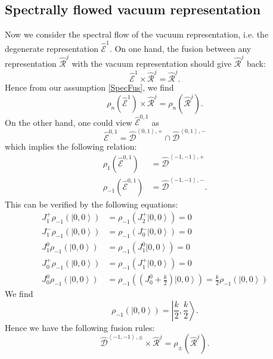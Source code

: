 \documentclass[10pt,a4paper]{article}
\numberwithin{equation}{section}
\newcommand{\ket}[1]{\left| #1 \right\rangle}
\newcommand{\vev}[1]{\left\langle #1 \right\rangle}
\begin{document}
\subsection{Spectrally flowed vacuum representation}
Now we consider the spectral flow of the vacuum representation, i.e. the degenerate representation $\hat{\mathcal{E}}^{1}$.
On one hand, the fusion between any representation $\hat{\mathcal{R}}^{j}$ with the vacuum representation should give 
$\hat{\mathcal{R}}^{j}$ back: 
\begin{equation}
    \hat{\mathcal{E}}^{1} \times \hat{\mathcal{R}}^{j} = \hat{\mathcal{R}}^{j}.
\end{equation}
Hence from our assumption \ref{SpecFus}, we find 
\begin{equation}
    \rho_{n} \left( \hat{\mathcal{E}}^{1} \right) \times \hat{\mathcal{R}}^{j} = \rho_{n} \left( \hat{\mathcal{R}}^{j} \right).
\end{equation}
On the other hand, one could view $\hat{\mathcal{E}}^{0,1}$ as
\begin{equation}
    \hat{\mathcal{E}}^{0,1} = \hat{\mathcal{D}}^{\vev{0,1},+} \cap \hat{\mathcal{D}}^{\vev{0,1},-}
\end{equation}
which implies the following relation: 
\begin{equation}
    \begin{aligned}
        \rho_{1} \left(\hat{\mathcal{E}}^{0,1}\right) &= \hat{\mathcal{D}}^{\vev{-1,-1},+}\\
        \rho_{-1} \left(\hat{\mathcal{E}}^{0,1}\right) &= \hat{\mathcal{D}}^{\vev{-1,-1},-}.
    \end{aligned}
\end{equation}
This can be verified by the following equations:
\begin{equation}
    \begin{aligned}
        J^{+}_{1} \rho_{-1}\left( \ket{0,0} \right) &= \rho_{-1} \left( J^{+}_{2} \ket{0,0} \right) = 0 \\
        J^{-}_{1} \rho_{-1}\left( \ket{0,0} \right) &= \rho_{-1} \left( J^{-}_{0} \ket{0,0} \right) = 0 \\
        J^{0}_{1} \rho_{-1}\left( \ket{0,0} \right) &= \rho_{-1} \left( J^{0}_{1} \ket{0,0} \right) = 0 \\
        J^{+}_{0} \rho_{-1}(\ket{0,0}) &= \rho_{-1} \left( J^{+}_{1} \ket{0,0} \right) = 0\\
        J^{0}_{0} \rho_{-1}\left( \ket{0,0} \right) &= \rho_{-1} \left( \left( J^{0}_{0} + \frac{k}{2} \right) \ket{0,0} \right) = \frac{k}{2} \rho_{-1}\left( \ket{0,0} \right)
    \end{aligned}
\end{equation}
We find 
\begin{equation}
    \rho_{-1} \left( \ket{0,0} \right) = \ket{\frac{k}{2}, \frac{k}{2}}.
\end{equation}
Hence we have the following fusion rules:
\begin{equation}
    \hat{\mathcal{D}}^{\vev{-1,-1},\pm} \times \hat{\mathcal{R}}^{j} = \rho_{\pm} \left( \hat{\mathcal{R}}^{j} \right).
\end{equation}
\end{document}
